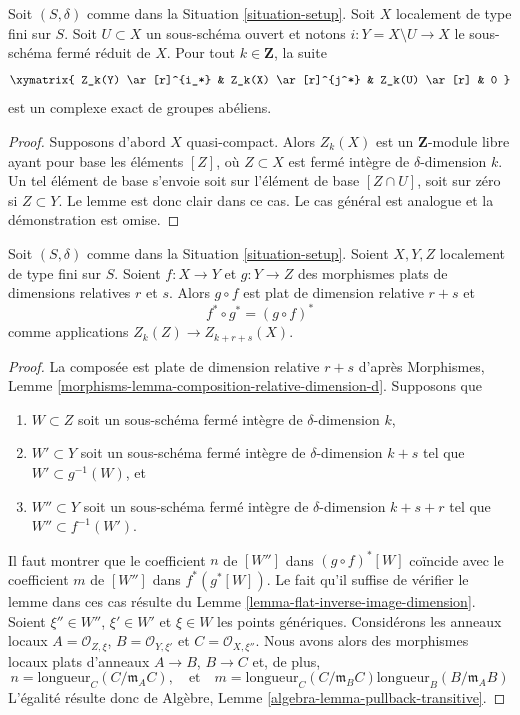 \begin{lemma}
\label{lemma-exact-sequence-open}
Soit $(S, \delta)$ comme dans la Situation \ref{situation-setup}.
Soit $X$ localement de type fini sur $S$.
Soit $U \subset X$ un sous-schéma ouvert et notons
$i : Y = X \setminus U \to X$ le sous-schéma fermé réduit de $X$.
Pour tout $k \in \mathbf{Z}$, la suite
$$
\xymatrix{
Z_k(Y) \ar[r]^{i_*} & Z_k(X) \ar[r]^{j^*} & Z_k(U) \ar[r] & 0
}
$$
est un complexe exact de groupes abéliens.
\end{lemma}

\begin{proof}
Supposons d'abord $X$ quasi-compact. Alors $Z_k(X)$ est un $\mathbf{Z}$-module libre
ayant pour base les éléments $[Z]$, où $Z \subset X$ est fermé intègre
de $\delta$-dimension $k$. Un tel élément de base s'envoie
soit sur l'élément de base $[Z \cap U]$, soit sur zéro si $Z \subset Y$.
Le lemme est donc clair dans ce cas. Le cas général est analogue
et la démonstration est omise.
\end{proof}

\begin{lemma}
\label{lemma-compose-flat-pullback}
Soit $(S, \delta)$ comme dans la Situation \ref{situation-setup}.
Soient $X, Y, Z$ localement de type fini sur $S$.
Soient $f : X \to Y$ et $g : Y \to Z$ des morphismes plats de dimensions relatives
$r$ et $s$. Alors $g \circ f$ est plat de dimension relative
$r + s$ et
$$
f^* \circ g^* = (g \circ f)^*
$$
comme applications $Z_k(Z) \to Z_{k + r + s}(X)$.
\end{lemma}

\begin{proof}
La composée est plate de dimension relative $r + s$ d'après
Morphismes, Lemme \ref{morphisms-lemma-composition-relative-dimension-d}.
Supposons que
\begin{enumerate}
\item $W \subset Z$ soit un sous-schéma fermé intègre de $\delta$-dimension $k$,
\item $W' \subset Y$ soit un sous-schéma fermé intègre de $\delta$-dimension
$k + s$ tel que $W' \subset g^{-1}(W)$, et
\item $W'' \subset Y$ soit un sous-schéma fermé intègre de $\delta$-dimension
$k + s + r$ tel que $W'' \subset f^{-1}(W')$.
\end{enumerate}
Il faut montrer que le coefficient $n$ de $[W'']$ dans
$(g \circ f)^*[W]$ coïncide avec le coefficient $m$ de
$[W'']$ dans $f^*(g^*[W])$. Le fait qu'il suffise de vérifier le lemme dans ces
cas résulte du Lemme \ref{lemma-flat-inverse-image-dimension}.
Soient $\xi'' \in W''$, $\xi' \in W'$
et $\xi \in W$ les points génériques. Considérons les anneaux locaux
$A = \mathcal{O}_{Z, \xi}$, $B = \mathcal{O}_{Y, \xi'}$
et $C = \mathcal{O}_{X, \xi''}$. Nous avons alors des morphismes locaux plats d'anneaux
$A \to B$, $B \to C$ et, de plus,
$$
n = \text{longueur}_C(C/\mathfrak m_AC),
\quad
\text{et}
\quad
m = \text{longueur}_C(C/\mathfrak m_BC) \text{longueur}_B(B/\mathfrak m_AB)
$$
L'égalité résulte donc de
Algèbre, Lemme \ref{algebra-lemma-pullback-transitive}.
\end{proof}

